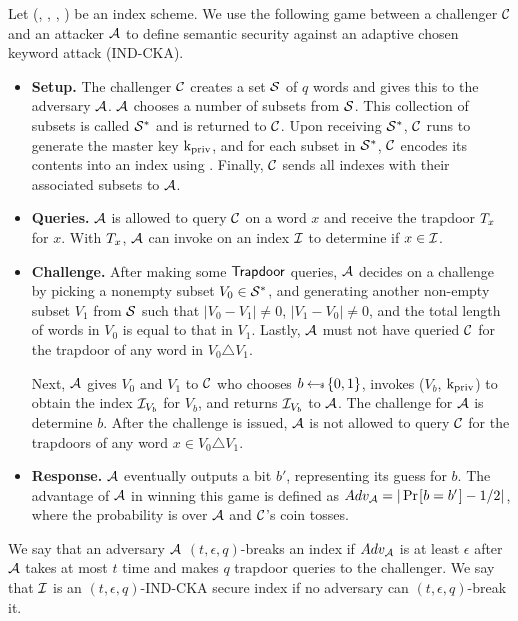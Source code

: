 \begin{definition}
	\normalfont
	Let (\kgen, \Trapdoor, \buildindex, \searchindex) be an index scheme. We use the following game between a challenger $\mathcal{C}$ and an attacker $\mathcal{A}$ to define semantic security against an adaptive chosen keyword attack (IND-CKA).
	\begin{itemize}
		\item \textbf{Setup.} The challenger $\mathcal{C}$ creates a set $\mathcal{S}$ of $q$ words and gives this to the adversary $\mathcal{A}$. $\mathcal{A}$ chooses a number of subsets from $\mathcal{S}$. This collection of subsets is called $\mathcal{S}^*$ and is returned to $\mathcal{C}$. Upon receiving $\mathcal{S}^*$, $\mathcal{C}$ runs \kgen to generate the master key $\text{k}_{\text{priv}}$, and for each subset in $\mathcal{S}^*$, $\mathcal{C}$ encodes its contents into an index using \buildindex. Finally, $\mathcal{C}$ sends all indexes with their associated subsets to $\mathcal{A}$.
		
		\item
\textbf{Queries.} $\mathcal{A}$ is allowed to query $\mathcal{C}$ on a word $x$ and receive the trapdoor $T_x$ for $x$. With $T_x$, $\mathcal{A}$ can invoke \searchindex on an index $\mathcal{I}$ to determine if $x \in \mathcal{I}$.
		
		\item \textbf{Challenge.} After making some $\textsf{Trapdoor}$ queries, $\mathcal{A}$ decides on a challenge by picking a nonempty subset $V_0 \in \mathcal{S}^*$, and generating another non-empty subset $V_1$ from $\mathcal{S}$ such that $|V_0 - V_1| \neq 0$, $|V_1 - V_0| \neq 0$, and the total length of words in $V_0$ is equal to that in $V_1$. Lastly, $\mathcal{A}$ must not have queried $\mathcal{C}$ for the trapdoor of any word in $V_0 \triangle V_1$.
		
		Next, $\mathcal{A}$ gives $V_0$ and $V_1$ to $\mathcal{C}$ who chooses $b \hskip2.3pt{\gets\!\!\mbox{\tiny${\$}$\normalsize}}\, \{0,1\}$, invokes \buildindex($V_b$, $\text{k}_{\text{priv}}$) to obtain the index $\mathcal{I}_{V_b}$ for $V_b$, and returns $\mathcal{I}_{V_b}$ to $\mathcal{A}$. The challenge for $\mathcal{A}$ is determine $b$. After the challenge is issued, $\mathcal{A}$ is not allowed to query $\mathcal{C}$ for the trapdoors of any word $x \in V_0 \triangle V_1$.
		
		\item \textbf{Response.} $\mathcal{A}$ eventually outputs a bit $b'$, representing its guess for $b$. The advantage of $\mathcal{A}$ in winning this game is defined as $\advantage_\adversary = |\prob{b = b'} - 1/2|$, where the probability is over $\mathcal{A}$ and $\mathcal{C}$'s coin tosses.
	\end{itemize}

	We say that an adversary $\mathcal{A}$ $(t, \epsilon, q)$-breaks an index if $Adv_{\mathcal{A}}$ is at least $\epsilon$ after $\mathcal{A}$ takes at most $t$ time and makes $q$ trapdoor queries to the challenger. We say that $\mathcal{I}$ is an $(t, \epsilon, q)$-IND-CKA secure index if no adversary can $(t, \epsilon, q)$-break it.
\end{definition}


